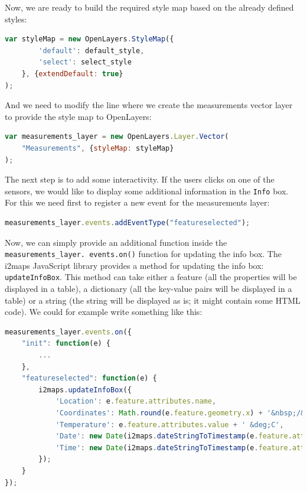 \documentclass[11pt]{article}
\begin{document}
Now, we are ready to build the required style map based on the already defined styles:

\begin{lstlisting}[language=JavaScript]
var styleMap = new OpenLayers.StyleMap({
        'default': default_style,
        'select': select_style
    }, {extendDefault: true}
);
\end{lstlisting}

And we need to modify the line where we create the measurements vector layer to provide the style map to OpenLayers:

\begin{lstlisting}[language=JavaScript]
var measurements_layer = new OpenLayers.Layer.Vector(
	"Measurements", {styleMap: styleMap}
);
\end{lstlisting}

The next step is to add some interactivity. If the users clicks on one of the sensors, we would like to display some additional information in the \texttt{Info} box. For this we need first to register a new event for the measurements layer:

\begin{lstlisting}[language=JavaScript]
measurements_layer.events.addEventType("featureselected");
\end{lstlisting}

Now, we can simply provide an additional function inside the \texttt{measurements\_layer. events.on()} function for updating the info box. The i2maps JavaScript library provides a method for updating the info box: \texttt{updateInfoBox}. This method can take either a feature (all the properties will be displayed in a table), a dictionary (all the key-value pairs will be displayed in a table) or a string (the string will be displayed as is; it might contain some HTML code). We could for example write something like this:

\begin{lstlisting}[language=JavaScript]
measurements_layer.events.on({
    "init": function(e) {
        ...
    },
    "featureselected": function(e) {
        i2maps.updateInfoBox({
            'Location': e.feature.attributes.name,
            'Coordinates': Math.round(e.feature.geometry.x) + '&nbsp;/&nbsp;' + Math.round(e.feature.geometry.y),
            'Temperature': e.feature.attributes.value + ' &deg;C',
            'Date': new Date(i2maps.dateStringToTimestamp(e.feature.attributes.time)).toLocaleDateString(),
            'Time': new Date(i2maps.dateStringToTimestamp(e.feature.attributes.time)).toLocaleTimeString()
        });
    }
});
\end{lstlisting}
\end{document}
